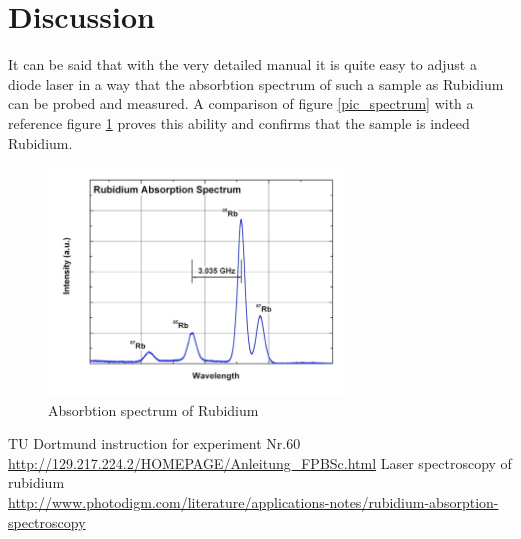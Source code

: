 \section{Discussion}
It can be said that with the very detailed manual it is quite easy to adjust a diode laser in a way that the absorbtion spectrum of such a sample as 
Rubidium can be probed and measured. A comparison of figure \ref{pic_spectrum} with a reference figure \ref{pic_ref} proves this ability and confirms that
the sample is indeed Rubidium.
\begin{figure}[H]
 \includegraphics[width=0.7\textwidth]{../pics/reference.jpg}
 \caption{Absorbtion spectrum of Rubidium \cite{ref}}
 \label{pic_ref}
\end{figure}


 \begin{thebibliography}{WissOnl}
 	 TU Dortmund instruction for experiment Nr.60 \url{http://129.217.224.2/HOMEPAGE/Anleitung_FPBSc.html}
 	 Laser spectroscopy of rubidium \\ \url{http://www.photodigm.com/literature/applications-notes/rubidium-absorption-spectroscopy}
 \end{thebibliography}




